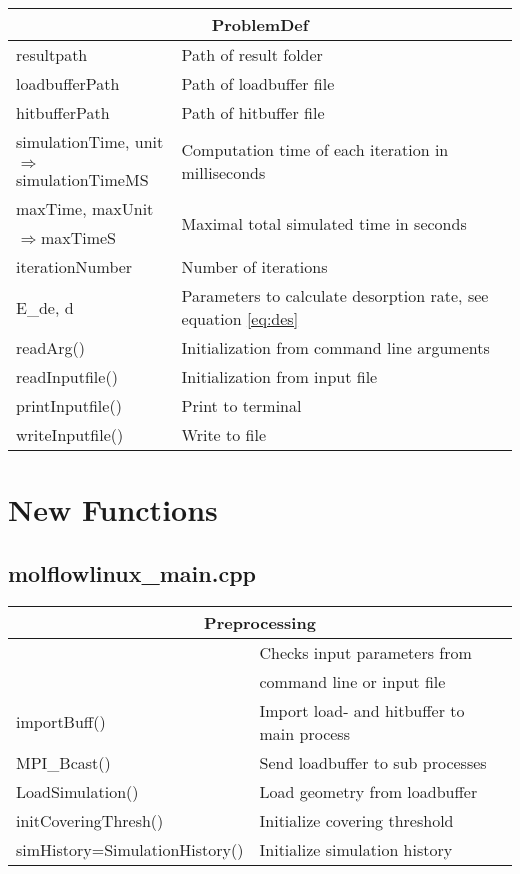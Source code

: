 \begin{center}
\begin{tabular}{|l|l|}
\hline
\multicolumn{2}{|c|}{\rule{0pt}{3ex}ProblemDef}\\
\hline
\rule{0pt}{3ex} resultpath& Path of result folder\\
\rule{0pt}{3ex} loadbufferPath& Path of loadbuffer file\\
\rule{0pt}{3ex} hitbufferPath& Path of hitbuffer file\\
\rule{0pt}{3ex} simulationTime, unit& \multirow{2}{*}{Computation time of each iteration in milliseconds}\\
\quad$\Rightarrow$simulationTimeMS&\\
\rule{0pt}{3ex} maxTime, maxUnit& \multirow{2}{*}{Maximal total simulated time in seconds}\\
\quad$\Rightarrow$maxTimeS&\\
\rule{0pt}{3ex} iterationNumber& Number of iterations\\
\rule{0pt}{3ex}  E\_de, d& Parameters to calculate desorption rate, see equation \ref{eq:des}\\
\hline
\rule{0pt}{3ex} readArg()& Initialization from command line arguments\\
\rule{0pt}{3ex} readInputfile()& Initialization from input file\\
\rule{0pt}{3ex} printInputfile()& Print to terminal\\
\rule{0pt}{3ex} writeInputfile()& Write to file\\
\hline
\end{tabular}
\end{center}

\section{New Functions}
\subsection{molflowlinux\_main.cpp}
\begin{center}
\begin{tabular}{|l|l|}
\hline
\multicolumn{2}{|c|}{\rule{0pt}{3ex}Preprocessing}\\
\hline
\rule{0pt}{3ex} \multirow{2}{*}{parametercheck()}& Checks input parameters from\\&command line or input file\\
\rule{0pt}{3ex} importBuff()& Import load- and hitbuffer to main process\\
\rule{0pt}{3ex} MPI\_Bcast()& Send loadbuffer to sub processes\\
\rule{0pt}{3ex} LoadSimulation()& Load geometry from loadbuffer\\
\rule{0pt}{3ex} initCoveringThresh()& Initialize covering threshold\\
\rule{0pt}{3ex} simHistory=SimulationHistory()& Initialize simulation history\\
\hline
\end{tabular}
\end{center}


